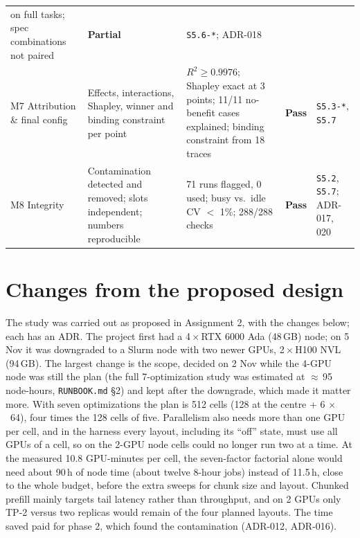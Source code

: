 \documentclass[10pt,a4paper]{article}
\newcommand{\x}{\ensuremath{\times}}
\newcommand{\fp}[1]{{\leavevmode\urlstyle{tt}\color{codecol}\nolinkurl{#1}}}
\newcommand{\pill}[2]{\colorbox{#1}{\sffamily\footnotesize\strut #2}}
\newcommand{\pass}{\pill{passbg}{\textcolor{passgreen}{\textbf{Pass}}}}
\newcommand{\partl}{\pill{partbg}{\textbf{Partial}}}
\begin{document}
{\begin{longtable}{@{}P{2.4cm}P{4.3cm}P{5.1cm}P{1.3cm}P{2.4cm}@{}}
on full tasks; spec combinations not paired & \partl & \texttt{S5.6-*}; ADR-018 \\
M7 Attribution \& final config & Effects, interactions, Shapley, winner and binding constraint per point &
$R^2 \ge 0.9976$; Shapley exact at 3 points; 11/11 no-benefit cases explained; binding constraint from 18 traces &
\pass & \texttt{S5.3-*}, \texttt{S5.7} \\
 M8 Integrity & Contamination detected and removed; slots independent; numbers reproducible & 71 runs
flagged, 0 used; busy vs.\ idle CV $<$ 1\%; 288/288 checks & \pass & \texttt{S5.2}, \texttt{S5.7}; ADR-017, 020 \\
\bottomrule
\end{longtable}}

\section{Changes from the proposed design}
The study was carried out as proposed in Assignment 2, with the changes below; each has an ADR. The project first had
a 4\,\x\,RTX 6000 Ada (48\,GB) node; on 5 Nov it was downgraded to a Slurm node with two newer GPUs,
2\,\x\,H100 NVL (94\,GB). The largest change is the scope, decided on 2 Nov while the 4-GPU node was still the plan
(the full 7-optimization study was estimated at $\approx$\,95 node-hours, \fp{RUNBOOK.md} \S2) and kept after the
downgrade, which made it matter more. With seven optimizations the plan is 512 cells (128 at the centre + 6 \x\ 64), four times the 128 cells of five.
Parallelism also needs more than one GPU per cell, and in the harness every layout, including its ``off'' state, must
use all GPUs of a cell, so on the 2-GPU node cells could no longer run two at a time. At the measured 10.8
GPU-minutes per cell, the seven-factor factorial alone would need about 90\,h of node time (about twelve 8-hour jobs)
instead of 11.5\,h, close to the whole budget, before the extra sweeps for chunk size and layout. Chunked prefill
mainly targets tail latency rather than throughput, and on 2 GPUs only TP-2 versus two replicas would remain of the
four planned layouts. The time saved paid for phase 2, which found the contamination (ADR-012, ADR-016).
\end{document}
